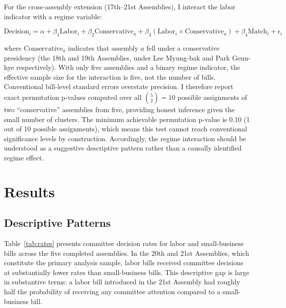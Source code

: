 \documentclass[11pt]{article}
\begin{document}
For the cross-assembly extension (17th--21st Assemblies), I interact the labor indicator with a regime variable:

\begin{equation}
\text{Decision}_i = \alpha + \beta_1 \text{Labor}_i + \beta_2 \text{Conservative}_a + \beta_3 (\text{Labor}_i \times \text{Conservative}_a) + \beta_4 \text{Match}_i + \epsilon_i
\label{eq:regime}
\end{equation}

\noindent where $\text{Conservative}_a$ indicates that assembly $a$ fell under a conservative presidency (the 18th and 19th Assemblies, under Lee Myung-bak and Park Geun-hye respectively). With only five assemblies and a binary regime indicator, the effective sample size for the interaction is five, not the number of bills. Conventional bill-level standard errors overstate precision. I therefore report exact permutation p-values computed over all $\binom{5}{2} = 10$ possible assignments of two ``conservative'' assemblies from five, providing honest inference given the small number of clusters. The minimum achievable permutation p-value is 0.10 (1 out of 10 possible assignments), which means this test cannot reach conventional significance levels by construction. Accordingly, the regime interaction should be understood as a suggestive descriptive pattern rather than a causally identified regime effect.


\section{Results}
\label{sec:results}

\subsection{Descriptive Patterns}
\label{sec:results-desc}

Table~\ref{tab:rates} presents committee decision rates for labor and small-business bills across the five completed assemblies. In the 20th and 21st Assemblies, which constitute the primary analysis sample, labor bills received committee decisions at substantially lower rates than small-business bills. This descriptive gap is large in substantive terms: a labor bill introduced in the 21st Assembly had roughly half the probability of receiving any committee attention compared to a small-business bill.
\end{document}
